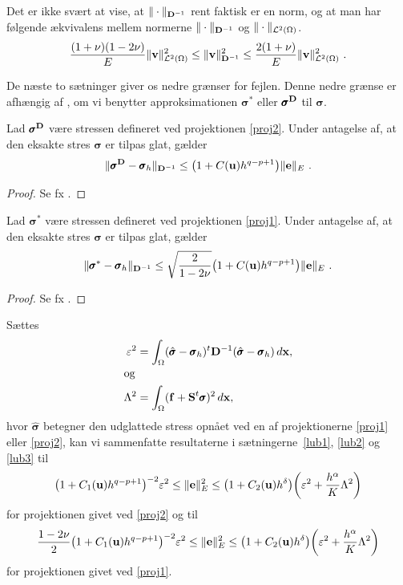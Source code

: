 \begin{remark}
Det er ikke svært at vise, at $\|\cdot\|_{{\bf D}^{-1}}$ rent faktisk er en norm,
og at man har følgende ækvivalens mellem normerne $\|\cdot\|_{{\bf D}^{-1}}$ og
$\|\cdot\|_{{\mathcal L}^2(\Omega)}$. 
\begin{equation}
  \frac{(1+\nu)(1-2\nu)}{E}\|{\bf v}\|_{{\mathcal L}^2(\Omega)}^2 
  \leq \|{\bf v}\|_{{\bf D}^{-1}}^2 \leq
  \frac{2(1+\nu)}{E}\|{\bf v}\|_{{\mathcal L}^2(\Omega)}^2 \ . 
\end{equation} 
\end{remark}
De næste to sætninger giver os nedre grænser for fejlen. Denne nedre
grænse er afhængig af , om vi benytter approksimationen
$\pmb{\sigma}^{\ast}$ eller $\pmb{\sigma}^{\bf D}$ til $\pmb\sigma$. 
\begin{theorem} \label{lub2}
Lad $\pmb{\sigma}^{\bf D}$ være stressen defineret ved projektionen \eqref{proj2}.
Under antagelse af, at den eksakte stres $\pmb{\sigma}$ er tilpas glat,
gælder
\begin{equation}
  \|\pmb{\sigma}^{\bf D} -\pmb{\sigma}_h\|_{{\bf D}^{-1}} \leq
  \bigl(1+C({\bf u})h^{q-p+1}\bigr)\|{\bf e}\|_E \ .
\end{equation}
\end{theorem}
\begin{proof}
Se fx \cite{zz2}. 
\end{proof}
\begin{theorem} \label{lub3}
Lad $\pmb{\sigma}^{\ast}$ være stressen defineret ved projektionen \eqref{proj1}.
Under antagelse af, at den eksakte stres $\pmb{\sigma}$ er tilpas glat,
gælder
\begin{equation}
  \|\pmb{\sigma}^{\ast} -\pmb{\sigma}_h\|_{{\bf D}^{-1}} \leq
  \sqrt{\frac{2}{1-2\nu}}\bigl(1+C({\bf u})h^{q-p+1}\bigr)\|{\bf e}\|_E \ .
\end{equation}
\end{theorem}
\begin{proof}
Se fx \cite{zz2}. 
\end{proof}

Sættes 
\begin{align}
  \varepsilon^2 &= \int_{\Omega} (\hat{\pmb{\sigma}}-\pmb{\sigma}_h)^t {\bf D}^{-1}
  (\hat{\pmb{\sigma}}-\pmb{\sigma}_h)\, d{\bf x}, \\
\intertext{og}
  \Lambda^2 &= \int_{\Omega} ({\bf f+S}^t\pmb{\sigma})^2\, d{\bf x},
\end{align}
hvor $\hat{\pmb{\sigma}}$ betegner den udglattede stress opnået ved en
af projektionerne \eqref{proj1} eller \eqref{proj2}, kan vi sammenfatte
resultaterne i sætningerne~\ref{lub1}, \ref{lub2} og \ref{lub3} til
\begin{equation}
  \bigl( 1+C_1({\bf u})h^{q-p+1}\bigr)^{-2}\varepsilon^2 \leq
  \|{\bf e}\|^2_E \leq
  \bigl( 1+C_2({\bf u})h^\delta\bigr)\biggl(\varepsilon^2 + 
  \frac{h^\alpha}{K}\Lambda^2 \biggr)
\end{equation}
for projektionen givet ved \eqref{proj2} og til
\begin{equation}
  \frac{1-2\nu}{2}\bigl( 1+C_1({\bf u})h^{q-p+1}\bigr)^{-2}\varepsilon^2 \leq
  \|{\bf e}\|^2_E \leq
  \bigl( 1+C_2({\bf u})h^\delta\bigr)\biggl(\varepsilon^2 + 
  \frac{h^\alpha}{K}\Lambda^2 \biggr)
\end{equation}
for projektionen givet ved \eqref{proj1}.

